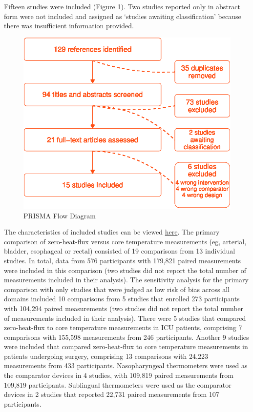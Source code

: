 \documentclass[smallextended]{svjour3}       %
\begin{document}
Fifteen studies were included (Figure 1). Two studies reported only in
abstract form were not included and assigned as `studies awaiting
classification' because there was insufficient information provided.

\begin{figure}

{\centering \includegraphics{fig-1-1} 

}

\caption{PRISMA Flow Diagram}\label{fig:fig-1}
\end{figure}

The characteristics of included studies can be viewed
\href{link\%20to\%20shiny\%20app}{here}. The primary comparison of
zero-heat-flux versus core temperature measurements (eg, arterial,
bladder, esophageal or rectal) consisted of 19 comparisons from 13
individual studies. In total, data from 576 participants with 179,821
paired measurements were included in this comparison (two studies did
not report the total number of measurements included in their analysis).
The sensitivity analysis for the primary comparison with only studies
that were judged as low risk of bias across all domains included 10
comparisons from 5 studies that enrolled 273 participants with 104,294
paired measurements (two studies did not report the total number of
measurements included in their analysis). There were 5 studies that
compared zero-heat-flux to core temperature measurements in ICU
patients, comprising 7 comparisons with 155,598 measurements from 246
participants. Another 9 studies were included that compared
zero-heat-flux to core temperature measurements in patients undergoing
surgery, comprising 13 comparisons with 24,223 measurements from 433
participants. Nasopharyngeal thermometers were used as the comparator
devices in 4 studies, with 109,819 paired measurements from 109,819
participants. Sublingual thermometers were used as the comparator
devices in 2 studies that reported 22,731 paired measurements from 107
participants.
\end{document}

